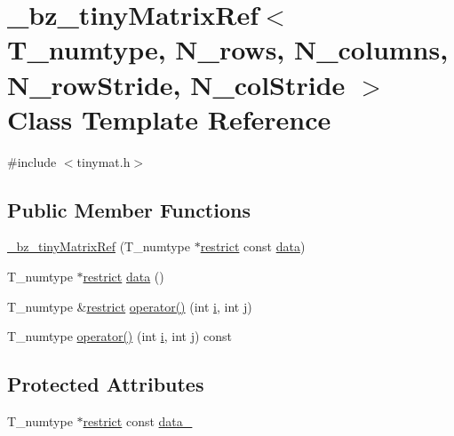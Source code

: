 \hypertarget{class__bz__tinyMatrixRef}{}\section{\+\_\+bz\+\_\+tiny\+Matrix\+Ref$<$ T\+\_\+numtype, N\+\_\+rows, N\+\_\+columns, N\+\_\+row\+Stride, N\+\_\+col\+Stride $>$ Class Template Reference}
\label{class__bz__tinyMatrixRef}


{\ttfamily \#include $<$tinymat.\+h$>$}

\subsection*{Public Member Functions}
\begin{DoxyCompactItemize}
\item 
\hyperlink{class__bz__tinyMatrixRef_a9e4dc6c221bbc559b2c1b4355dd7f2d8}{\+\_\+bz\+\_\+tiny\+Matrix\+Ref} (T\+\_\+numtype $\ast$\hyperlink{compiler_8h_a080abdcb9c02438f1cd2bb707af25af8}{restrict} const \hyperlink{class__bz__tinyMatrixRef_a65a58f79ab0684f745a20e301b760d1b}{data})
\item 
T\+\_\+numtype $\ast$\hyperlink{compiler_8h_a080abdcb9c02438f1cd2bb707af25af8}{restrict} \hyperlink{class__bz__tinyMatrixRef_a65a58f79ab0684f745a20e301b760d1b}{data} ()
\item 
T\+\_\+numtype \&\hyperlink{compiler_8h_a080abdcb9c02438f1cd2bb707af25af8}{restrict} \hyperlink{class__bz__tinyMatrixRef_a737cd006cbcdfbc48a637549a981859d}{operator()} (int \hyperlink{indexexpr_8h_aabd77643995707c185e95c8cb2782c81}{i}, int \hyperlink{indexexpr_8h_aa1f3325d66516548e69238097857fa98}{j})
\item 
T\+\_\+numtype \hyperlink{class__bz__tinyMatrixRef_aa9ebdeb1aa8ff665e5240c3db42a1917}{operator()} (int \hyperlink{indexexpr_8h_aabd77643995707c185e95c8cb2782c81}{i}, int \hyperlink{indexexpr_8h_aa1f3325d66516548e69238097857fa98}{j}) const 
\end{DoxyCompactItemize}
\subsection*{Protected Attributes}
\begin{DoxyCompactItemize}
\item 
T\+\_\+numtype $\ast$\hyperlink{compiler_8h_a080abdcb9c02438f1cd2bb707af25af8}{restrict} const \hyperlink{class__bz__tinyMatrixRef_a666cebf5ac4968e46c15327b45a7e962}{data\+\_\+}
\end{DoxyCompactItemize}


